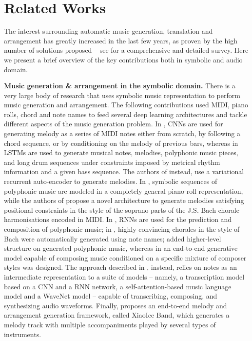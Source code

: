 \documentclass[journal]{IEEEtran}
\begin{document}
\section{Related Works}
\label{related_works}

The interest surrounding automatic music generation, translation and arrangement has greatly increased in the last few years, as proven by the high number of solutions proposed -- see \cite{briot2020deep} for a comprehensive and detailed survey. Here we present a brief overview of the key contributions both in symbolic and audio domain. 

\textbf{Music generation \& arrangement in the symbolic domain.} There is a very large body of research that uses symbolic music representation to perform music generation and arrangement. The following contributions used MIDI, piano rolls, chord and note names to feed several deep learning architectures and tackle different aspects of the music generation problem. 
In \cite{yang2017midinet}, CNNs are used for generating melody as a series of MIDI notes either from scratch, by following a chord sequence, or by conditioning on the melody of previous bars, whereas in \cite{mogren2016c,mangal2019lstm,jaques2016tuning,makris2017combining} LSTMs are used to generate musical notes, melodies, polyphonic music pieces, and long drum sequences under constraints imposed by metrical rhythm information and a given bass sequence. The authors of \cite{yamshchikov2017music,roberts2018hierarchical, lattner2019highlevel} instead, use a variational recurrent auto-encoder to generate melodies. In \cite{boulanger2012modeling}, symbolic sequences of polyphonic music are modeled in a completely general piano-roll representation, while the authors of \cite{hadjeres2017interactive} propose a novel architecture to generate melodies satisfying positional constraints in the style of the soprano parts of the J.S. Bach chorale harmonisations encoded in MIDI. In \cite{johnson2017generating}, RNNs are used for the prediction and composition of polyphonic music; in \cite{hadjeres2017deepbach}, highly convincing chorales in the style of Bach were automatically generated using note names; \cite{lattner2018imposing} added higher-level structure on generated polyphonic music, whereas in \cite{mao2018deepj} an end-to-end generative model capable of composing music conditioned on a specific mixture of composer styles  was designed. The approach described in \cite{hawthorne2018enabling}, instead, relies on notes as an intermediate representation to a suite of models -- namely, a transcription model based on a CNN and a RNN network\cite{hawthorne2017onsets}, a self-attention-based music language model \cite{huang2018music} and a WaveNet model \cite{oord2016wavenet} -- capable of transcribing, composing, and synthesizing audio waveforms. Finally, \cite{zhu2018xiaoice} proposes an end-to-end melody and arrangement generation framework, called XiaoIce Band, which generates a melody track with multiple accompaniments played by several types of instruments. 
\end{document}

